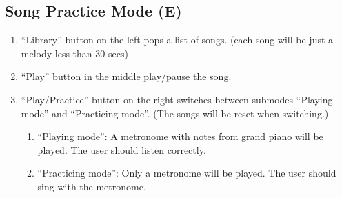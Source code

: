 \documentclass{article}
\begin{document}
\subsection{Song Practice Mode (E) }
\begin{enumerate}
  \item “Library” button on the left pops a list of songs. (each song will be just a melody less than 30 secs)
  \item “Play” button in the middle play/pause the song.
  \item “Play/Practice” button on the right switches between submodes “Playing mode” and “Practicing mode”. (The songs will be reset when switching.)
    \begin{enumerate}
      \item “Playing mode”: A metronome with notes from grand piano will be played. The user should listen correctly.
      \item “Practicing mode”: Only a metronome will be played.  The user should sing with the metronome.
    \end{enumerate}

\end{enumerate}
\end{document}
